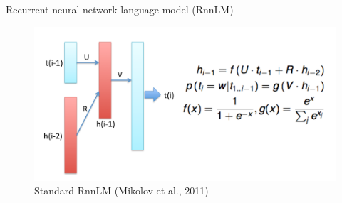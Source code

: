 \documentclass[pdf]{beamer}
\newcommand{\ABS}[1]{\lvert #1 \rvert}
\begin{document}
\begin{frame}{Recurrent neural network language model (RnnLM)}
\begin{figure}
\begin{center}
\includegraphics[scale=0.25]{rnn_standard.png}
\end{center}
\caption{Standard RnnLM (Mikolov et al., 2011)}
\end{figure}
\end{frame}
%
\end{document}
